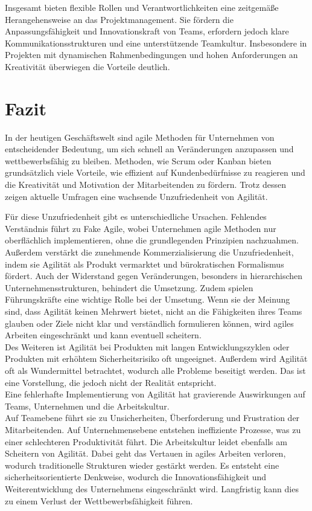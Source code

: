 \documentclass[ngerman]{seminarvorlage}
\begin{document}
Insgesamt bieten flexible Rollen und Verantwortlichkeiten eine zeitgemäße Herangehensweise an das Projektmanagement. Sie fördern die Anpassungsfähigkeit und Innovationskraft von Teams, erfordern jedoch klare Kommunikationsstrukturen und eine unterstützende Teamkultur. Insbesondere in Projekten mit dynamischen Rahmenbedingungen und hohen Anforderungen an Kreativität überwiegen die Vorteile deutlich.  
\cite{luhr_projektrollen_2023}

\section{Fazit}
In der heutigen Geschäftswelt sind agile Methoden für Unternehmen von entscheidender Bedeutung, um sich schnell an Veränderungen anzupassen und wettbewerbsfähig zu bleiben. Methoden, wie Scrum oder Kanban bieten grundsätzlich viele Vorteile, wie effizient auf Kundenbedürfnisse zu reagieren und die Kreativität und Motivation der Mitarbeitenden zu fördern. Trotz dessen zeigen aktuelle Umfragen eine wachsende Unzufriedenheit von Agilität.

Für diese Unzufriedenheit gibt es unterschiedliche Ursachen. Fehlendes Verständnis führt zu \glqq Fake Agile\grqq\:, wobei Unternehmen agile Methoden nur oberflächlich implementieren, ohne die grundlegenden Prinzipien nachzuahmen. Außerdem verstärkt die zunehmende Kommerzialisierung die Unzufriedenheit, indem sie Agilität als Produkt vermarktet und bürokratischen Formalismus fördert. Auch der Widerstand gegen Veränderungen, besonders in hierarchischen Unternehmensstrukturen, behindert die Umsetzung. Zudem spielen Führungskräfte eine wichtige Rolle bei der Umsetung. Wenn sie der Meinung sind, dass Agilität keinen Mehrwert bietet, nicht an die Fähigkeiten ihres Teams glauben oder Ziele nicht klar und verständlich formulieren können, wird agiles Arbeiten eingeschränkt und kann eventuell scheitern.\\
Des Weiteren ist Agilität bei Produkten mit langen Entwicklungszyklen oder Produkten mit erhöhtem Sicherheitsrisiko oft ungeeignet. 
Außerdem wird Agilität oft als Wundermittel betrachtet, wodurch alle Probleme beseitigt werden. Das ist eine Vorstellung, die jedoch nicht der Realität entspricht.\\

Eine fehlerhafte Implementierung von Agilität hat gravierende Auswirkungen auf Teams, Unternehmen und die Arbeitskultur.\\ Auf Teamebene führt sie zu Unsicherheiten, Überforderung und Frustration der Mitarbeitenden. Auf Unternehmensebene entstehen ineffiziente Prozesse, was zu einer schlechteren Produktivität führt. Die Arbeitskultur leidet ebenfalls am Scheitern von Agilität. Dabei geht das Vertauen in agiles Arbeiten verloren, wodurch traditionelle Strukturen wieder gestärkt werden. Es entsteht eine sicherheitsorientierte Denkweise, wodurch die Innovationsfähigkeit und Weiterentwicklung des Unternehmens eingeschränkt wird. Langfristig kann dies zu einem Verlust der Wettbewerbsfähigkeit führen.
\end{document}
